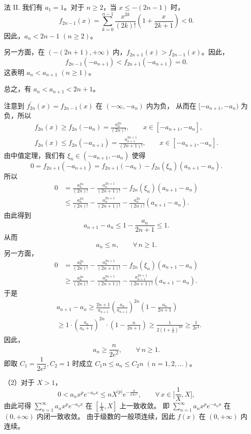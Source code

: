\begin{enumerate}
\begin{proofc}
法 II. 我们有 $a_{1}=1$。对于 $n \geq 2$，当 $x \leq-(2n-1)$ 时，
$$f_{2n-1}(x)=\sum_{k=0}^{n-1} \frac{x^{2k}}{(2k)!}\left(1+\frac{x}{2k+1}\right)<0.$$
因此，$a_{n}<2n-1$ $(n \geq 2)$。

另一方面，在 $(-(2n+1),+\infty)$ 内，$f_{2n+1}(x)>f_{2n-1}(x)$。因此，
$$f_{2n-1}(-a_{n+1})<f_{2n+1}(-a_{n+1})=0.$$
这表明 $a_{n}<a_{n+1}$ $(n \geq 1)$。

总之，有 $a_{n}<a_{n+1}<2n+1$。

注意到 $f_{2n}^{\prime}(x)=f_{2n-1}(x)$ 在 $(-\infty,-a_{n})$ 内为负，
从而在 $[-a_{n+1},-a_{n})$ 为负，所以
$$\begin{gathered}
f_{2n}(x) \geq f_{2n}(-a_{n})=\frac{a_{n}^{2n}}{(2n)!}, \qquad x \in [-a_{n+1},-a_{n}], \\
f_{2n}(x) \leq f_{2n}(-a_{n+1})=\frac{a_{n+1}^{2n+1}}{(2n+1)!}, \qquad x \in [-a_{n+1},-a_{n}].
\end{gathered}$$
由中值定理，我们有 $\xi_{n} \in (-a_{n+1},-a_{n})$ 使得
$$0=f_{2n+1}(-a_{n+1})=f_{2n+1}(-a_{n})-f_{2n}(\xi_{n})(a_{n+1}-a_{n}).$$
所以
\begin{align*}
0 & =\frac{a_{n}^{2n}}{(2n)!}-\frac{a_{n}^{2n+1}}{(2n+1)!}-f_{2n}(\xi_{n})(a_{n+1}-a_{n}) \\
& \leq \frac{a_{n}^{2n}}{(2n)!}-\frac{a_{n}^{2n+1}}{(2n+1)!}-\frac{a_{n}^{2n}}{(2n)!}(a_{n+1}-a_{n}).
\end{align*}
由此得到
$$a_{n+1}-a_{n} \leq 1-\frac{a_{n}}{2n+1} \leq 1.$$
从而
$$a_{n} \leq n, \qquad \forall\, n \geq 1.$$
另一方面，
\begin{align*}
0 & =\frac{a_{n}^{2n}}{(2n)!}-\frac{a_{n}^{2n+1}}{(2n+1)!}-f_{2n}(\xi_{n})(a_{n+1}-a_{n}) \\
& \geq \frac{a_{n}^{2n}}{(2n)!}-\frac{a_{n}^{2n+1}}{(2n+1)!}-\frac{a_{n+1}^{2n+1}}{(2n+1)!}(a_{n+1}-a_{n}).
\end{align*}
于是
\begin{align*}
& a_{n+1}-a_{n} \geq \frac{2n+1}{a_{n+1}}\left(\frac{a_{n}}{a_{n+1}}\right)^{2n}\left(1-\frac{a_{n}}{2n+1}\right) \\
& \geq 1 \cdot\left(\frac{a_{n}}{a_{n}+1}\right)^{2n} \cdot\left(1-\frac{n}{2n+1}\right) 
\geq \frac{1}{2\left(1+\frac{1}{n}\right)^{2n}} \geq \frac{1}{2e^{2}}.
\end{align*}
因此，
$$a_{n} \geq \frac{n}{2e^{2}}, \qquad \forall\, n \geq 1.$$
即取 $C_{1}=\dfrac{1}{2e^{2}}, C_{2}=1$ 时成立 $C_{1} n \leq a_{n} \leq C_{2} n$ $(n=1,2, \ldots)$。

（2）对于 $X>1$，
$$0<a_{n} x^{p} e^{-a_{n} x} \leq n X^{|p|} e^{-\frac{n}{2Xe^{2}}}, 
\qquad \forall\, x \in\Big[\frac{1}{X}, X\Big],$$
由此可得 $\displaystyle\sum_{n=1}^{\infty} a_{n} x^{p} e^{-a_{n} x}$ 在 $\left[\frac{1}{X}, X\right]$ 上一致收敛。
即 $\displaystyle\sum_{n=1}^{\infty} a_{n} x^{p} e^{-a_{n} x}$ 在 $(0,+\infty)$ 内闭一致收敛。
由于级数的一般项连续，因此 $f(x)$ 在 $(0,+\infty)$ 内连续。
\end{proofc}


\end{enumerate}
